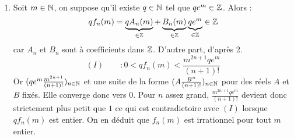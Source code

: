 \begin{enumerate}
\item Soit $m\in\mathbb{N}$, on suppose qu'il existe $q\in \mathbb{N}$ tel que $qe^m\in \mathbb{Z}$. Alors :
\begin{displaymath}
 qf_n(m) =\underbrace{qA_n(m)}_{\in\mathbb{Z}} + \underbrace{B_n(m)}_{\in \mathbb{Z}} \underbrace{qe^m}_{\in \mathbb{Z}} \in \mathbb{Z}
\end{displaymath}
car $A_n$ et $B_n$ sont à coefficients dans $\mathbb{Z}$. D'autre part, d'après 2.
\begin{displaymath}
 (I)\qquad : 0<qf_n(m)< \dfrac{m^{2n+1}qe^{m}}{(n+1)!}
\end{displaymath}
Or $(qe^m \frac{m^{2n+1}}{(n+1)!})_{n\in\mathbb{N}}$ et une suite de la forme $(A \frac{B^{n}}{(n+1)!})_{n\in\mathbb{N}}$ pour des réels $A$ et $B$ fixés. Elle converge donc vers 0.\newline
Pour $n$ assez grand, $\frac{m^{2n+1}qe^{m}}{(n+1)!}$ devient donc strictement plus petit que $1$ ce qui est contradictoire avec $(I)$ lorsque $qf_n(m)$ est entier. On en déduit que $f_n(m)$ est irrationnel pour tout $m$ entier. 
\end{enumerate}

